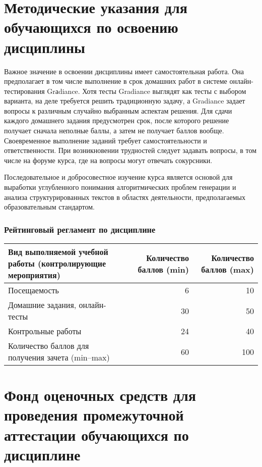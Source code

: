 \documentclass[a4paper,12pt]{article}
\begin{document}
\section{Методические указания для обучающихся по освоению дисциплины}
Важное значение в освоении
дисциплины имеет самостоятельная работа. Она предполагает
в том числе выполнение в срок домашних работ в системе
онлайн-тестирования Grаdiance. Хотя тесты Gradiance
выглядят как тесты с выбором варианта, на деле требуется
решить традиционную задачу, а Gradiance задает вопросы
к различным случайно выбранным аспектам решения. Для
сдачи каждого домашнего задания предусмотрен срок,
после которого решение получает сначала неполные баллы,
а затем не получает баллов вообще. Своевременное выполнение
заданий требует самостоятельности и ответственности. При
возникновении трудностей следует задавать вопросы, в том числе
на форуме курса, где на вопросы могут отвечать сокурсники.
\par
Последовательное и добросовестное изучение курса является основой для
выработки углубленного понимания алгоритмических проблем генерации и анализа
структурированных текстов в областях деятельности, предполагаемых образовательным
стандартом.



\subsubsection*{Рейтинговый регламент по дисциплине}
\begin{longtable}{|>{\raggedright\arraybackslash}p{110mm}|r|r|}
\hline
\centering\arraybackslash Вид выполняемой учебной работы (контролирующие мероприятия) & 
\multicolumn{1}{p{20mm}|}{\centering\arraybackslash Количество баллов (min)} & 
\multicolumn{1}{p{20mm}|}{\centering\arraybackslash Количество баллов (max)} \\
\hline
Посещаемость                    & 6 & 10 \\ 
\hline
Домашние задания, онлайн-тесты  & 30 & 50 \\ 
\hline
Контрольные работы              & 24 & 40 \\ 
\hline
Количество баллов для получения зачета (min--max) & 60 & 100 \\ 

\hline
\end{longtable}

\section{Фонд оценочных средств для проведения промежуточной аттестации обучающихся по дисциплине}
\end{document}
